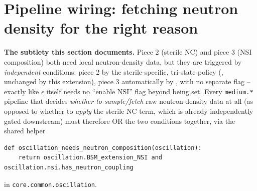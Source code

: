 \section{Pipeline wiring: fetching neutron density for the right reason}
\label{sec:impl-pipeline}

\begin{notebox}
\textbf{The subtlety this section documents.} Piece 2 (sterile NC) and
piece 3 (NSI composition) both need local neutron-density data, but they
are triggered by \emph{independent} conditions: piece 2 by the
sterile-specific, tri-state  policy
(, unchanged
by this extension), piece 3 automatically by
, with no separate flag --
exactly like $\epsilon$ itself needs no ``enable NSI'' flag beyond
 being set. Every \texttt{medium.*} pipeline that
decides \emph{whether to sample/fetch} raw neutron-density data at all
(as opposed to whether to \emph{apply} the sterile NC term, which is
already independently gated downstream) must therefore OR the two
conditions together, via the shared helper
\begin{lstlisting}[style=tpython]
def oscillation_needs_neutron_composition(oscillation):
    return oscillation.BSM_extension_NSI and oscillation.nsi.has_neutron_coupling
\end{lstlisting}
in \texttt{core.common.oscillation}.
\end{notebox}

